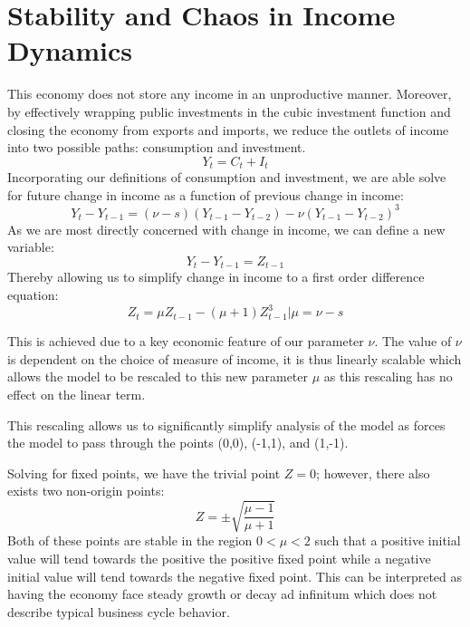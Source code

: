 \section{Stability and Chaos in Income Dynamics}
This economy does not store any income in an unproductive manner. Moreover, by effectively wrapping public investments in the cubic investment function and closing the economy from exports and imports, we reduce the outlets of income into two possible paths: consumption and investment.
\begin{equation}
    Y_t=C_t+I_t
\end{equation}
Incorporating our definitions of consumption and investment, we are able solve for future change in income as a function of previous change in income:
\begin{equation*}
    Y_t-Y_{t-1}=(\nu-s)(Y_{t-1}-Y_{t-2})-\nu(Y_{t-1}-Y_{t-2})^3
\end{equation*}
As we are most directly concerned with change in income, we can define a new variable:
\begin{equation*}
    Y_t-Y_{t-1}=Z_{t-1}
\end{equation*}
Thereby allowing us to simplify change in income to a first order difference equation:
\begin{equation}
    Z_t=\mu Z_{t-1}-(\mu+1)Z_{t-1}^3|\mu=\nu-s
\end{equation}

This is achieved due to a key economic feature of our parameter $\nu$. The value of $\nu$ is dependent on the choice of measure of income, it is thus linearly scalable which allows the model to be rescaled to this new parameter $\mu$ as this rescaling has no effect on the linear term. 

This rescaling allows us to significantly simplify analysis of the model as forces the model to pass through the points (0,0), (-1,1), and (1,-1).

Solving for fixed points, we have the trivial point $Z=0$; however, there also exists two non-origin points:
\begin{equation*}
    Z=\pm\sqrt{\frac{\mu-1}{\mu+1}}
\end{equation*}
Both of these points are stable in the region $0<\mu<2$ such that a positive initial value will tend towards the positive the positive fixed point while a negative initial value will tend towards the negative fixed point. This can be interpreted as having the economy face steady growth or decay ad infinitum which does not describe typical business cycle behavior.

